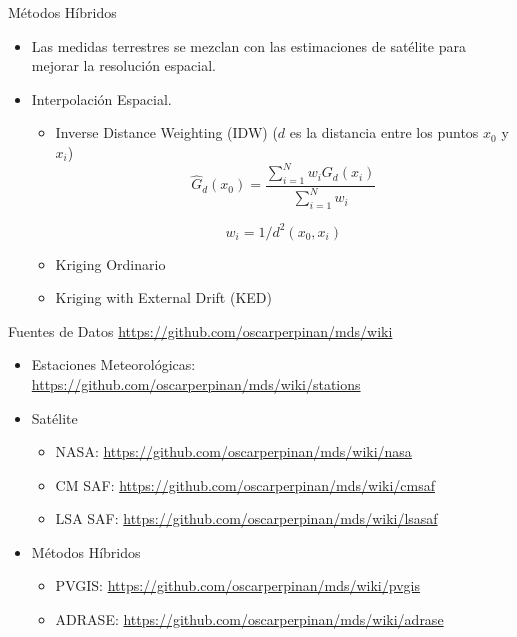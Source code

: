 \documentclass[xcolor={usenames,svgnames,dvipsnames}]{beamer}
\begin{document}
\begin{frame}[label={sec:org89dec51}]{Métodos Híbridos}
\begin{itemize}
\item Las medidas terrestres se mezclan con las estimaciones de satélite para mejorar la resolución espacial.
\item Interpolación Espacial.
\begin{itemize}
\item \alert{Inverse Distance Weighting (IDW)} (\(d\) es la distancia entre los puntos \(x_0\) y  \(x_i\))
\[
\widehat{G}_d(x_0) = \frac{\sum_{i=1}^N w_i G_{d}(x_i)}{\sum_{i=1}^N w_i} 
\]

\[
  w_i = 1/d^2(x_0, x_i)
\]
\item \alert{Kriging Ordinario}
\item \alert{Kriging with External Drift (KED)}
\end{itemize}
\end{itemize}
\end{frame}

\begin{frame}[label={sec:org65f9b39}]{Fuentes de Datos}
\url{https://github.com/oscarperpinan/mds/wiki}

\begin{itemize}
\item Estaciones Meteorológicas: \url{https://github.com/oscarperpinan/mds/wiki/stations}
\item Satélite
\begin{itemize}
\item NASA: \url{https://github.com/oscarperpinan/mds/wiki/nasa}
\item CM SAF: \url{https://github.com/oscarperpinan/mds/wiki/cmsaf}
\item LSA SAF: \url{https://github.com/oscarperpinan/mds/wiki/lsasaf}
\end{itemize}

\item Métodos Híbridos
\begin{itemize}
\item PVGIS: \url{https://github.com/oscarperpinan/mds/wiki/pvgis}
\item ADRASE: \url{https://github.com/oscarperpinan/mds/wiki/adrase}
\end{itemize}
\end{itemize}
\end{frame}
\end{document}
